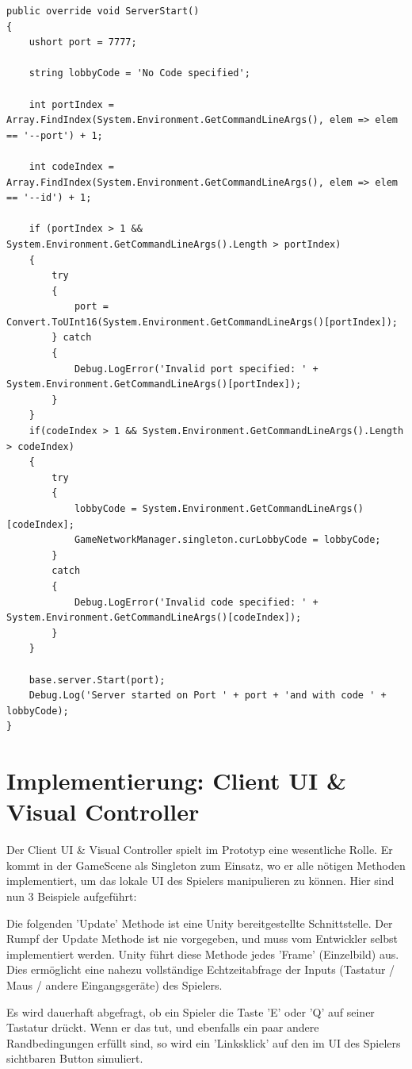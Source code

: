 \begin{lstlisting}[caption= OwnKcpTransport.cs ServerStart()]
public override void ServerStart()
{
	ushort port = 7777;
	
	string lobbyCode = 'No Code specified';
	
	int portIndex = Array.FindIndex(System.Environment.GetCommandLineArgs(), elem => elem == '--port') + 1;
	
	int codeIndex = Array.FindIndex(System.Environment.GetCommandLineArgs(), elem => elem == '--id') + 1;
	
	if (portIndex > 1 && System.Environment.GetCommandLineArgs().Length > portIndex)
	{
		try
		{
			port = Convert.ToUInt16(System.Environment.GetCommandLineArgs()[portIndex]);
		} catch
		{
			Debug.LogError('Invalid port specified: ' + System.Environment.GetCommandLineArgs()[portIndex]);
		}
	}
	if(codeIndex > 1 && System.Environment.GetCommandLineArgs().Length > codeIndex)
	{
		try
		{
			lobbyCode = System.Environment.GetCommandLineArgs()[codeIndex];
			GameNetworkManager.singleton.curLobbyCode = lobbyCode;
		}
		catch
		{
			Debug.LogError('Invalid code specified: ' + System.Environment.GetCommandLineArgs()[codeIndex]);
		}
	}
	
	base.server.Start(port);
	Debug.Log('Server started on Port ' + port + 'and with code ' + lobbyCode);
}
\end{lstlisting}


\section{Implementierung: Client UI \& Visual Controller}
\label{implementierung:client_UI_Controller}

Der Client UI \& Visual Controller spielt im Prototyp eine wesentliche Rolle. Er kommt in der GameScene als Singleton \cite{M.Gatrell.2009} zum Einsatz, wo er alle nötigen Methoden implementiert, um das lokale UI des Spielers manipulieren zu können. Hier sind nun 3 Beispiele aufgeführt:

Die folgenden 'Update' Methode ist eine Unity bereitgestellte Schnittstelle. Der Rumpf der Update Methode ist nie vorgegeben, und muss vom Entwickler selbst implementiert werden. Unity führt diese Methode jedes 'Frame' (Einzelbild) \cite{Wikipedia.2021j} aus. Dies ermöglicht eine nahezu vollständige Echtzeitabfrage der Inputs (Tastatur / Maus / andere Eingangsgeräte) des Spielers.

Es wird dauerhaft abgefragt, ob ein Spieler die Taste 'E' oder 'Q' auf seiner Tastatur drückt. Wenn er das tut, und ebenfalls ein paar andere Randbedingungen erfüllt sind, so wird ein 'Linksklick' auf den im UI des Spielers sichtbaren Button simuliert.

